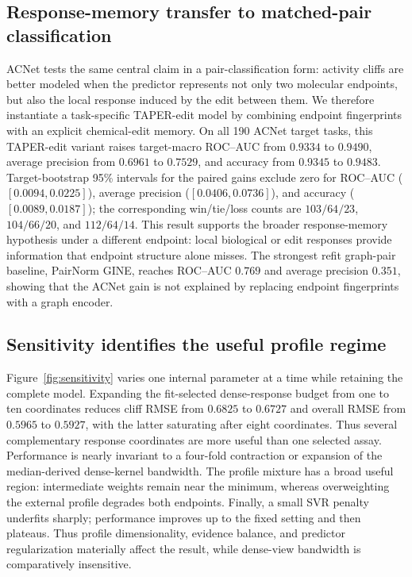 \documentclass[manuscript,nonacm]{acmart}
\newcommand{\method}{TAPER\xspace}
\begin{document}




\subsection{Response-memory transfer to matched-pair classification}
ACNet tests the same central claim in a pair-classification form: activity
cliffs are better modeled when the predictor represents not only two molecular
endpoints, but also the local response induced by the edit between them. We
therefore instantiate a task-specific \method{}-edit model by combining endpoint
fingerprints with an explicit chemical-edit memory. On all 190 ACNet target
tasks, this \method{}-edit variant raises target-macro
ROC--AUC from $0.9334$ to $0.9490$, average precision from $0.6961$ to $0.7529$,
and accuracy from $0.9345$ to $0.9483$. Target-bootstrap 95\% intervals for the
paired gains exclude zero for ROC--AUC ($[0.0094,0.0225]$), average precision
($[0.0406,0.0736]$), and accuracy ($[0.0089,0.0187]$); the corresponding
win/tie/loss counts are $103/64/23$, $104/66/20$, and $112/64/14$. This result
supports the broader response-memory hypothesis under a different endpoint:
local biological or edit responses provide information that endpoint structure
alone misses. The strongest refit graph-pair baseline, PairNorm GINE, reaches
ROC--AUC $0.769$ and average precision $0.351$, showing that the ACNet gain is
not explained by replacing endpoint fingerprints with a graph encoder.



\subsection{Sensitivity identifies the useful profile regime}
Figure~\ref{fig:sensitivity} varies one internal parameter at a time while
retaining the complete model. Expanding the fit-selected dense-response budget
from one to ten coordinates reduces cliff RMSE from $0.6825$ to
$0.6727$ and overall RMSE from $0.5965$ to $0.5927$, with the latter saturating
after eight coordinates. Thus several complementary response coordinates are
more useful than one selected assay. Performance is nearly invariant to a
four-fold contraction or expansion of the median-derived dense-kernel
bandwidth. The profile mixture has a broad useful region: intermediate weights
remain near the minimum, whereas overweighting the external profile degrades
both endpoints. Finally, a small SVR penalty underfits sharply; performance
improves up to the fixed setting and then plateaus. Thus profile dimensionality,
evidence balance, and predictor regularization materially affect the result,
while dense-view bandwidth is comparatively insensitive.
\end{document}
